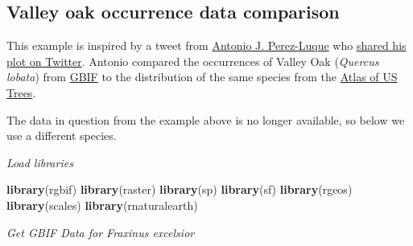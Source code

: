 \documentclass[3p]{elsarticle} %
\newenvironment{Shaded}{\begin{snugshade}}{\end{snugshade}}
\newcommand{\DataTypeTok}[1]{\textcolor[rgb]{0.13,0.29,0.53}{#1}}
\newcommand{\KeywordTok}[1]{\textcolor[rgb]{0.13,0.29,0.53}{\textbf{#1}}}
\newcommand{\NormalTok}[1]{#1}
\newcommand{\OperatorTok}[1]{\textcolor[rgb]{0.81,0.36,0.00}{\textbf{#1}}}
\newcommand{\StringTok}[1]{\textcolor[rgb]{0.31,0.60,0.02}{#1}}
\begin{document}
\hypertarget{valley-oak-occurrence-data-comparison}{%
\subsection{Valley oak occurrence data
comparison}\label{valley-oak-occurrence-data-comparison}}

This example is inspired by a tweet from
\href{https://twitter.com/ajpelu}{Antonio J. Perez-Luque} who
\href{https://twitter.com/ajpelu/status/473951167567757312}{shared his
plot on Twitter}. Antonio compared the occurrences of Valley Oak
(\emph{Quercus lobata}) from \href{http://www.gbif.org/}{GBIF} to the
distribution of the same species from the
\href{http://esp.cr.usgs.gov/data/little/}{Atlas of US Trees}.

The data in question from the example above is no longer available, so
below we use a different species.

\emph{Load libraries}

\begin{Shaded}
\begin{Highlighting}[]
\KeywordTok{library}\NormalTok{(}\StringTok{\textquotesingle{}rgbif\textquotesingle{}}\NormalTok{)}
\KeywordTok{library}\NormalTok{(}\StringTok{\textquotesingle{}raster\textquotesingle{}}\NormalTok{)}
\KeywordTok{library}\NormalTok{(}\StringTok{\textquotesingle{}sp\textquotesingle{}}\NormalTok{)}
\KeywordTok{library}\NormalTok{(}\StringTok{\textquotesingle{}sf\textquotesingle{}}\NormalTok{)}
\KeywordTok{library}\NormalTok{(}\StringTok{\textquotesingle{}rgeos\textquotesingle{}}\NormalTok{)}
\KeywordTok{library}\NormalTok{(}\StringTok{\textquotesingle{}scales\textquotesingle{}}\NormalTok{)}
\KeywordTok{library}\NormalTok{(}\StringTok{\textquotesingle{}rnaturalearth\textquotesingle{}}\NormalTok{)}
\end{Highlighting}
\end{Shaded}

\emph{Get GBIF Data for Fraxinus excelsior}

\begin{Shaded}
\end{Shaded}
\end{document}
